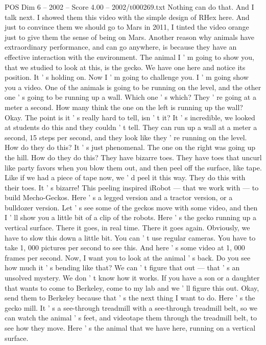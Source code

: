 \begin{textsample}{POS Dim 6 – 2002 – Score 4.00 – 2002/t000269.txt}
Nothing can do that.
And I talk next.
I showed them this video with the simple design of RHex here.
And just to convince them we should go to Mars in 2011, I tinted the video orange just to give them the sense of being on Mars.
Another reason why animals have extraordinary performance, and can go anywhere, is because they have an effective interaction with the environment.
The animal I ' m going to show you, that we studied to look at this, is the gecko.
We have one here and notice its position.
It ' s holding on.
Now I ' m going to challenge you.
I ' m going show you a video.
One of the animals is going to be running on the level, and the other one ' s going to be running up a wall.
Which one ' s which?
They ' re going at a meter a second.
How many think the one on the left is running up the wall?
Okay.
The point is it ' s really hard to tell, isn ' t it?
It ' s incredible, we looked at students do this and they couldn ' t tell.
They can run up a wall at a meter a second, 15 steps per second, and they look like they ' re running on the level.
How do they do this?
It ' s just phenomenal.
The one on the right was going up the hill.
How do they do this?
They have bizarre toes.
They have toes that uncurl like party favors when you blow them out, and then peel off the surface, like tape.
Like if we had a piece of tape now, we ' d peel it this way.
They do this with their toes.
It ' s bizarre!
This peeling inspired iRobot — that we work with — to build Mecho-Geckos.
Here ' s a legged version and a tractor version, or a bulldozer version.
Let ' s see some of the geckos move with some video, and then I ' ll show you a little bit of a clip of the robots.
Here ' s the gecko running up a vertical surface.
There it goes, in real time.
There it goes again.
Obviously, we have to slow this down a little bit.
You can ' t use regular cameras.
You have to take 1, 000 pictures per second to see this.
And here ' s some video at 1, 000 frames per second.
Now, I want you to look at the animal ' s back.
Do you see how much it ' s bending like that?
We can ' t figure that out — that ' s an unsolved mystery.
We don ' t know how it works.
If you have a son or a daughter that wants to come to Berkeley, come to my lab and we ' ll figure this out.
Okay, send them to Berkeley because that ' s the next thing I want to do.
Here ' s the gecko mill.
It ' s a see-through treadmill with a see-through treadmill belt, so we can watch the animal ' s feet, and videotape them through the treadmill belt, to see how they move.
Here ' s the animal that we have here, running on a vertical surface.

\end{textsample}
